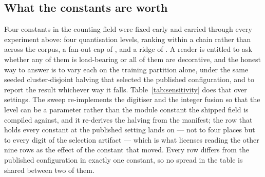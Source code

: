 \documentclass[11pt]{article}
\begin{document}
\subsection{What the constants are worth}
\label{sec:sensitivity}
Four constants in the counting field were fixed early and carried through every
experiment above: four quantisation levels, ranking within a chain rather than
across the corpus, a fan-out cap of \TabCap{}, and a ridge of \TabRidge{}. A
reader is entitled to ask whether any of them is load-bearing or all of them are
decorative, and the honest way to answer is to vary each on the training
partition alone, under the same seeded cluster-disjoint halving that selected the
published configuration, and to report the result whichever way it falls.
Table~\ref{tab:sensitivity} does that over \SensSettings{} settings. The sweep
re-implements the digitiser and the integer fusion so that the level can be a
parameter rather than the module constant the shipped field is compiled against,
and it re-derives the halving from the manifest; the row that holds every
constant at the published setting lands on \SensLevelsFour{} --- not to four
places but to every digit of the selection artifact --- which is what licenses
reading the other nine rows as the effect of the constant that moved. Every row
differs from the published configuration in exactly one constant, so no spread in
the table is shared between two of them.
\end{document}
